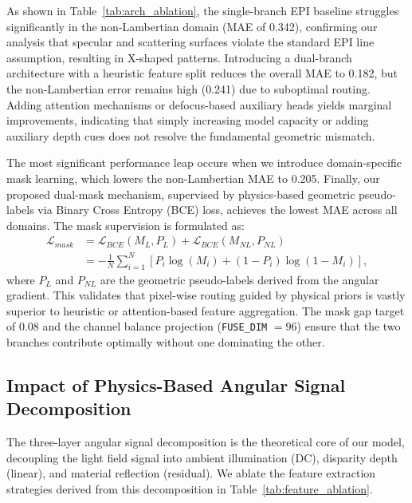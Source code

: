 \documentclass[lettersize,journal]{IEEEtran}
\begin{document}
As shown in Table~\ref{tab:arch_ablation}, the single-branch EPI baseline struggles significantly in the non-Lambertian domain (MAE of 0.342), confirming our analysis that specular and scattering surfaces violate the standard EPI line assumption, resulting in X-shaped patterns. Introducing a dual-branch architecture with a heuristic feature split reduces the overall MAE to 0.182, but the non-Lambertian error remains high (0.241) due to suboptimal routing. Adding attention mechanisms or defocus-based auxiliary heads yields marginal improvements, indicating that simply increasing model capacity or adding auxiliary depth cues does not resolve the fundamental geometric mismatch. 

The most significant performance leap occurs when we introduce domain-specific mask learning, which lowers the non-Lambertian MAE to 0.205. Finally, our proposed dual-mask mechanism, supervised by physics-based geometric pseudo-labels via Binary Cross Entropy (BCE) loss, achieves the lowest MAE across all domains. The mask supervision is formulated as:
\begin{align}
\mathcal{L}_{mask} &= \mathcal{L}_{BCE}(M_L, P_{L}) + \mathcal{L}_{BCE}(M_{NL}, P_{NL}) \label{eq:ch4_2} \\
&= - \frac{1}{N} \sum_{i=1}^{N} \left[ P_i \log(M_i) + (1-P_i) \log(1-M_i) \right], \nonumber
\end{align}
where $P_L$ and $P_{NL}$ are the geometric pseudo-labels derived from the angular gradient. This validates that pixel-wise routing guided by physical priors is vastly superior to heuristic or attention-based feature aggregation. The mask gap target of $0.08$ and the channel balance projection (\texttt{FUSE\_DIM} $= 96$) ensure that the two branches contribute optimally without one dominating the other.

\subsection{Impact of Physics-Based Angular Signal Decomposition}

The three-layer angular signal decomposition is the theoretical core of our model, decoupling the light field signal into ambient illumination (DC), disparity depth (linear), and material reflection (residual). We ablate the feature extraction strategies derived from this decomposition in Table~\ref{tab:feature_ablation}.
\end{document}
